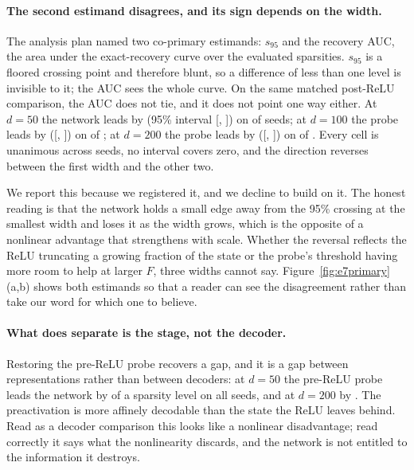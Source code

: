 \documentclass[preprint,12pt]{elsarticle}
\theoremstyle{definition}
\begin{document}
\paragraph{The second estimand disagrees, and its sign depends on the width.} The analysis plan named
two co-primary estimands: $s_{95}$ and the recovery AUC, the area under the exact-recovery curve
over the evaluated sparsities. $s_{95}$ is a floored crossing point and therefore blunt, so a
difference of less than one level is invisible to it; the AUC sees the whole curve. On the same
matched post-ReLU comparison, the AUC does not tie, and it does not point one way either.
At $d=50$ the network leads by \AucFiftyDiff{} (95\% interval
[\AucFiftyCiLow, \AucFiftyCiHigh]) on \AucFiftyNetWins{} of \EsevenSeeds{} seeds; at $d=100$ the
probe leads by \AucHundredDiff{} ([\AucHundredCiLow, \AucHundredCiHigh]) on
\AucHundredProbeWins{} of \EsevenSeeds{}; at $d=200$ the probe leads by \AucTwoHundredDiff{}
([\AucTwoHundredCiLow, \AucTwoHundredCiHigh]) on \AucTwoHundredProbeWins{} of \EsevenSeeds{}. Every
cell is unanimous across seeds, no interval covers zero, and the direction reverses between the first
width and the other two.

We report this because we registered it, and we decline to build on it. The honest reading is that
the network holds a small edge away from the 95\% crossing at the smallest width and loses it as the
width grows, which is the opposite of a nonlinear advantage that strengthens with scale. Whether the
reversal reflects the ReLU truncating a growing fraction of the state or the probe's threshold
having more room to help at larger $F$, three widths cannot say. Figure~\ref{fig:e7primary}(a,b)
shows both estimands so that a reader can see the disagreement rather than take our word for which
one to believe.

\paragraph{What does separate is the stage, not the decoder.} Restoring the pre-ReLU probe recovers a
gap, and it is a gap between representations rather than between decoders: at $d=50$ the pre-ReLU
probe leads the network by \PrimLfourFiftyPreDiff{} of a sparsity level on all
\PrimLfourFiftyPreProbeWins{} seeds, and at $d=200$ by \PrimLfourTwoHundredPreDiff{}. The
preactivation is more affinely decodable than the state the ReLU leaves behind. Read as a decoder
comparison this looks like a nonlinear disadvantage; read correctly it says what the nonlinearity
discards, and the network is not entitled to the information it destroys.
\end{document}
